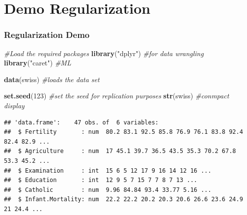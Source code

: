 \documentclass[
  shownotes,
  xcolor={svgnames},
  hyperref={colorlinks,citecolor=DarkBlue,linkcolor=DarkRed,urlcolor=DarkBlue}
  , aspectratio=169]{beamer}
\newenvironment{Shaded}{\begin{snugshade}}{\end{snugshade}}
\newcommand{\CommentTok}[1]{\textcolor[rgb]{0.56,0.35,0.01}{\textit{#1}}}
\newcommand{\DecValTok}[1]{\textcolor[rgb]{0.00,0.00,0.81}{#1}}
\newcommand{\KeywordTok}[1]{\textcolor[rgb]{0.13,0.29,0.53}{\textbf{#1}}}
\newcommand{\NormalTok}[1]{#1}
\newcommand{\StringTok}[1]{\textcolor[rgb]{0.31,0.60,0.02}{#1}}
\begin{document}
\section{Demo Regularization}
\begin{frame}[fragile]
\frametitle{Regularization Demo}

\begin{scriptsize}
   
\begin{Shaded}
\begin{Highlighting}[]
\CommentTok{\#Load the required packages}
\KeywordTok{library}\NormalTok{(}\StringTok{"dplyr"}\NormalTok{) }\CommentTok{\#for data wrangling}
\KeywordTok{library}\NormalTok{(}\StringTok{"caret"}\NormalTok{) }\CommentTok{\#ML}

\KeywordTok{data}\NormalTok{(swiss) }\CommentTok{\#loads the data set}

\KeywordTok{set.seed}\NormalTok{(}\DecValTok{123}\NormalTok{) }\CommentTok{\#set the seed for replication purposes}
\KeywordTok{str}\NormalTok{(swiss) }\CommentTok{\#conmpact display}
\end{Highlighting}
\end{Shaded}
\end{scriptsize}

\begin{tiny}


\begin{verbatim}
## 'data.frame':    47 obs. of  6 variables:
##  $ Fertility       : num  80.2 83.1 92.5 85.8 76.9 76.1 83.8 92.4 82.4 82.9 ...
##  $ Agriculture     : num  17 45.1 39.7 36.5 43.5 35.3 70.2 67.8 53.3 45.2 ...
##  $ Examination     : int  15 6 5 12 17 9 16 14 12 16 ...
##  $ Education       : int  12 9 5 7 15 7 7 8 7 13 ...
##  $ Catholic        : num  9.96 84.84 93.4 33.77 5.16 ...
##  $ Infant.Mortality: num  22.2 22.2 20.2 20.3 20.6 26.6 23.6 24.9 21 24.4 ...
\end{verbatim}
\end{tiny}


\end{frame}
\end{document}
